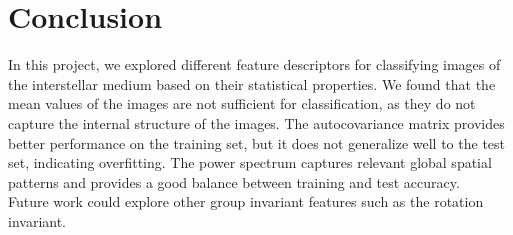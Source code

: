\documentclass[12pt,a4paper]{article}
\begin{document}
\section{Conclusion}
In this project, we explored different feature descriptors for classifying images of the interstellar medium based on their statistical properties.
We found that the mean values of the images are not sufficient for classification, as they do not capture the internal structure of the images.
The autocovariance matrix provides better performance on the training set, but it does not generalize well to the test set, indicating overfitting.
The power spectrum captures relevant global spatial patterns and provides a good balance between training and test accuracy. \\
Future work could explore other group invariant features such as the rotation invariant.
\end{document}
